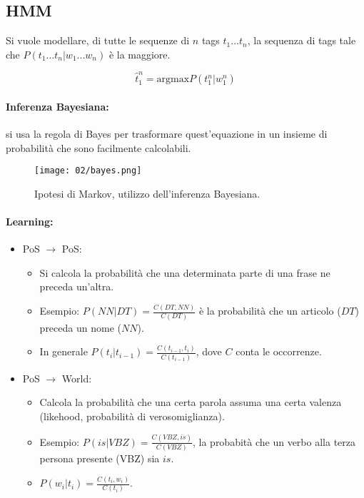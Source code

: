 \subsection{HMM}

Si vuole modellare, di tutte le sequenze di $n$ tags $t_1...t_n$, la sequenza di tags tale che $P(t_1...t_n|w_1...w_n)$ è la maggiore. 

$$\hat{t}^n_1 = \text{argmax} P(t^n_1|w^n_1)$$



\paragraph{Inferenza Bayesiana:} si usa la regola di Bayes per trasformare quest'equazione in un insieme di probabilità che sono facilmente calcolabili.

\begin{figure}[h]
    \centering
    \texttt{[image: 02/bayes.png]}
    \caption{Ipotesi di Markov, utilizzo dell'inferenza Bayesiana.}
\end{figure}


\paragraph{Learning:}

\begin{itemize}
  \item PoS $\rightarrow$ PoS: 
    \begin{itemize}
      \item Si calcola la probabilità che una determinata parte di una frase ne preceda un'altra. 
      \item Esempio: $P(NN|DT) = \frac{C(DT,NN)}{C(DT)}$ è la probabilità che un articolo ($DT$) preceda un nome ($NN$).
      \item In generale $P(t_i|t_{i - 1}) = \frac{C(t_{i - 1}, t_i)}{C(t_{i - 1})}$, dove $C$ conta le occorrenze.  
    \end{itemize}
  \item PoS $\rightarrow$ World:
    \begin{itemize}
      \item Calcola la probabilità che una certa parola assuma una certa valenza (likehood, probabilità di verosomiglianza).
      \item Esempio: $P(is|VBZ) = \frac{C(VBZ, is)}{C(VBZ)}$, la probabità che un verbo alla terza persona presente (VBZ) sia $is$.
      \item $P(w_i|t_i) = \frac{C(t_i, w_i)}{C(t_i)}$.
    \end{itemize}
\end{itemize}

